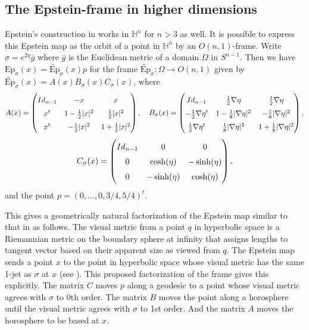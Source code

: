 \documentclass[11pt]{amsart}
\renewcommand{\H}{\mathbb{H}}
\begin{document}
\subsection{The Epstein-frame in higher dimensions}
\label{higher-dims}


Epstein's construction in \cite{epstein1984} works in $\H^n$ for $n > 3$ as well.
It is possible to express this Epstein map as the orbit of a point in $\H^n$ by an $O(n,1)$-frame.
Write $\sigma = e^{2\eta} \bar{g}$ where $\bar{g}$ is the Euclidean metric of a domain $\Omega$ in $S^{n-1}$.
Then we have $\mathrm{Ep}_\sigma(x) = \widetilde{\mathrm{Ep}}_\sigma(x)p$ for the frame $\widetilde{\mathrm{Ep}}_\sigma: \Omega \to O(n,1)$ given by $\widetilde{\mathrm{Ep}}_\sigma(x) = A(x) B_\sigma(x) C_\sigma(x)$, where 
\[
A(x) = \def\arraystretch{1.5}\begin{pmatrix}
Id_{n-1} & -x & x \\
x^t & 1- \frac{1}{2}|x|^2 & \frac{1}{2} |x|^2 \\
x^t & -\frac{1}{2}|x|^2 & 1 + \frac{1}{2} |x|^2
\end{pmatrix}, \ \ \
B_\sigma(x) = 
\def\arraystretch{1.5}
\begin{pmatrix}
Id_{n-1} & \frac{1}{2} \nabla\eta  & \frac{1}{2}\nabla\eta \\
-\frac{1}{2} \nabla\eta^t & 1-\frac{1}{8} |\nabla\eta|^2 & -\frac{1}{8} |\nabla\eta|^2 \\
\frac{1}{2}\nabla\eta^t & \frac{1}{8} |\nabla\eta|^2 & 1 + \frac{1}{8} |\nabla\eta|^2 
\end{pmatrix},
\]
\[
C_\sigma(x) = 
\def\arraystretch{1.5}
\begin{pmatrix}
Id_{n-1} & 0 & 0 \\
0 & \cosh(\eta) & -\sinh(\eta) \\
0 & -\sinh(\eta) & \cosh(\eta) 
\end{pmatrix},
\]
and the point $p = (0, \ldots, 0 , 3/4,5/4)^t$. 

This gives a geometrically natural factorization of the Epstein map similar to that in \cite{dumas2017} as follows. 
The visual metric from a point $q$ in hyperbolic space is a Riemannian metric on the boundary sphere at infinity that assigns lengths to tangent vector based on their apparent size as viewed from $q$.
The Epstein map sends a point $x$ to the point in hyperbolic space whose visual metric has the same 1-jet as $\sigma$ at $x$ (see \cite{anderson1998}).
This proposed factorization of the frame gives this explicitly.
The matrix $C$ moves $p$ along a geodesic to a point whose visual metric agrees with $\sigma$ to 0th order.
The matrix $B$ moves the point along a horosphere until the visual metric agrees with $\sigma$ to 1st order. 
And the matrix $A$ moves the horosphere to be based at $x$.
\end{document}
